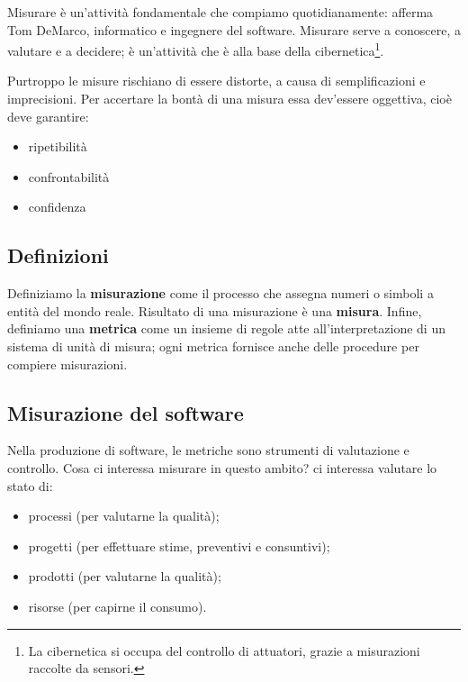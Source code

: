 \documentclass[a4paper]{article}
\begin{document}
		
Misurare è un'attività fondamentale che compiamo quotidianamente:  afferma Tom DeMarco, informatico e ingegnere del software. Misurare serve a conoscere, a valutare e a decidere; è un'attività che è alla base della cibernetica\footnote{La cibernetica si occupa del controllo di attuatori, grazie a misurazioni raccolte da sensori.}.
		
Purtroppo le misure rischiano di essere distorte, a causa di semplificazioni e imprecisioni. Per accertare la bontà di una misura essa dev'essere oggettiva, cioè deve garantire:
		
	\begin{itemize}
		
			
	\item ripetibilità
			
	\item confrontabilità
			
	\item confidenza
		
	\end{itemize}


		
	\subsection{Definizioni}

		
Definiziamo la \textbf{misurazione} come il processo che assegna numeri o simboli a entità del mondo reale. Risultato di una misurazione è una \textbf{misura}. Infine, definiamo una \textbf{metrica} come un insieme di regole atte all'interpretazione di un sistema di unità di misura; ogni metrica fornisce anche delle procedure per compiere misurazioni.

		
	\subsection{Misurazione del software}

		
Nella produzione di software, le metriche sono strumenti di valutazione e controllo. Cosa ci interessa misurare in questo ambito? ci interessa valutare lo stato di:
		
	\begin{itemize}
		
			
	\item processi (per valutarne la qualità);
			
	\item progetti (per effettuare stime, preventivi e consuntivi);
			
	\item prodotti (per valutarne la qualità);
			
	\item risorse (per capirne il consumo).
		
	\end{itemize}
\end{document}
